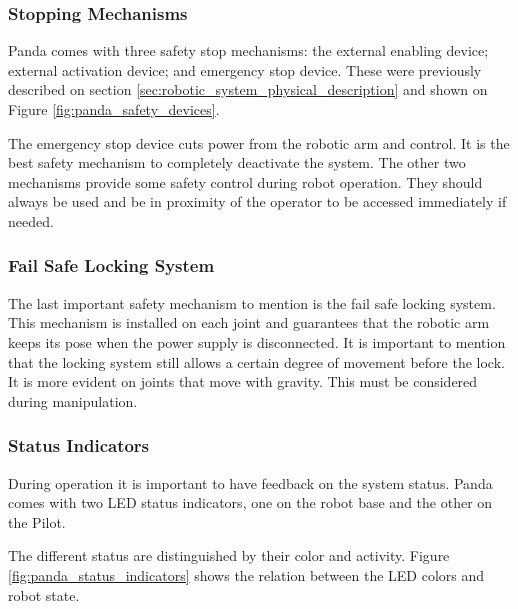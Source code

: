 \subsubsection*{Stopping Mechanisms}
\label{subsubsec:robotic_system_operation_safety_stopping_mechanisms}

Panda comes with three safety stop mechanisms: the external enabling device; external activation device; and emergency stop device. These were previously described on section \ref{sec:robotic_system_physical_description} and shown on Figure \ref{fig:panda_safety_devices}.

The emergency stop device cuts power from the robotic arm and control. It is the best safety mechanism to completely deactivate the system. The other two mechanisms provide some safety control during robot operation. They should always be used and be in proximity of the operator to be accessed immediately if needed.


\subsubsection*{Fail Safe Locking System}
\label{subsubsec:robotic_system_operation_safety_fail_safe_locking_system}

The last important safety mechanism to mention is the fail safe locking system. This mechanism is installed on each joint and guarantees that the robotic arm keeps its pose when the power supply is disconnected. It is important to mention that the locking system still allows a certain degree of movement before the lock. It is more evident on joints that move with gravity. This must be considered during manipulation.


\subsubsection*{Status Indicators}
\label{subsec:robotic_system_operation_safety_status_indicators}

During operation it is important to have feedback on the system status. Panda comes with two LED status indicators, one on the robot base and the other on the Pilot.

The different status are distinguished by their color and activity. Figure \ref{fig:panda_status_indicators} shows the relation between the LED colors and robot state.

